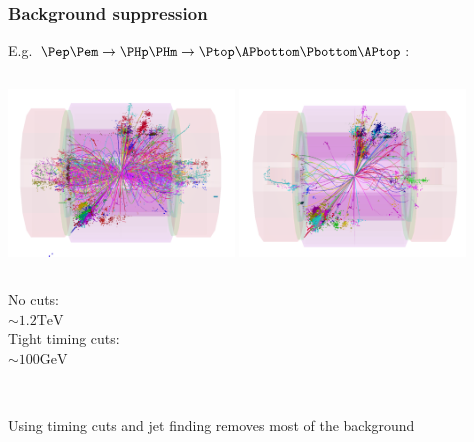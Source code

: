 \documentclass{beamer}
\begin{document}
\begin{frame}
\frametitle{Background suppression}
E.g. $\Pep\Pem\to\PHp\PHm\to\Ptop\APbottom\Pbottom\APtop$:
\begin{columns}[c]
\column{6cm}
\centering
\includegraphics[width=6cm]{../SIDWorkshop/HH2.pdf}
\column{6cm}
\centering
\includegraphics[width=6cm]{../SIDWorkshop/HH2tight.pdf}
\end{columns}
\begin{columns}[c]
\column{6cm}
\centering
No cuts:\\ \alert{$\sim1.2\textrm{TeV}$}\\
{\color{blue}{\scriptsize 10ns window}}
\column{6cm}
\centering
Tight timing cuts:\\ \alert{$\sim100\textrm{GeV}$}
\end{columns}
~\\
\alert{Using timing cuts and jet finding removes most of the background}
\end{frame}
\end{document}
